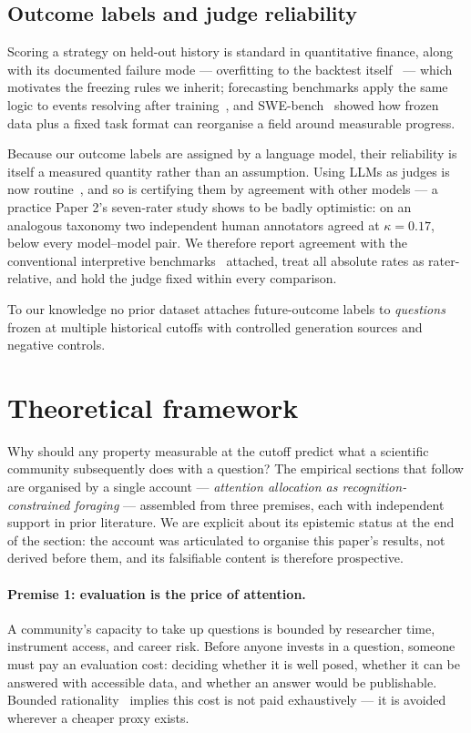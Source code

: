 \documentclass[11pt]{article}
\begin{document}
\subsection{Outcome labels and judge reliability}

Scoring a strategy on held-out history is standard in quantitative finance,
along with its documented failure mode --- overfitting to the backtest
itself~\cite{bailey2014} --- which motivates the freezing rules we inherit;
forecasting benchmarks apply the same logic to events resolving after
training~\cite{zou2022}, and SWE-bench~\cite{jimenez2024} showed how frozen
data plus a fixed task format can reorganise a field around measurable
progress.

Because our outcome labels are assigned by a language model, their
reliability is itself a measured quantity rather than an assumption. Using
LLMs as judges is now routine~\cite{zheng2023}, and so is certifying them by
agreement with other models --- a practice Paper 2's seven-rater study shows
to be badly optimistic: on an analogous taxonomy two independent human
annotators agreed at $\kappa = 0.17$, below every model--model pair. We
therefore report agreement with the conventional interpretive
benchmarks~\cite{landis1977} attached, treat all absolute rates as
rater-relative, and hold the judge fixed within every comparison.

To our knowledge no prior dataset attaches future-outcome labels to
\emph{questions} frozen at multiple historical cutoffs with controlled
generation sources and negative controls.

\section{Theoretical framework}
\label{sec:theory}

Why should any property measurable at the cutoff predict what a scientific
community subsequently does with a question? The empirical sections that
follow are organised by a single account --- \emph{attention allocation as
recognition-constrained foraging} --- assembled from three premises, each
with independent support in prior literature. We are explicit about its
epistemic status at the end of the section: the account was articulated to
organise this paper's results, not derived before them, and its falsifiable
content is therefore prospective.

\paragraph{Premise 1: evaluation is the price of attention.} A community's
capacity to take up questions is bounded by researcher time, instrument
access, and career risk. Before anyone invests in a question, someone must
pay an evaluation cost: deciding whether it is well posed, whether it can
be answered with accessible data, and whether an answer would be
publishable. Bounded rationality~\cite{simon1955} implies this cost is not
paid exhaustively --- it is avoided wherever a cheaper proxy exists.
\end{document}
